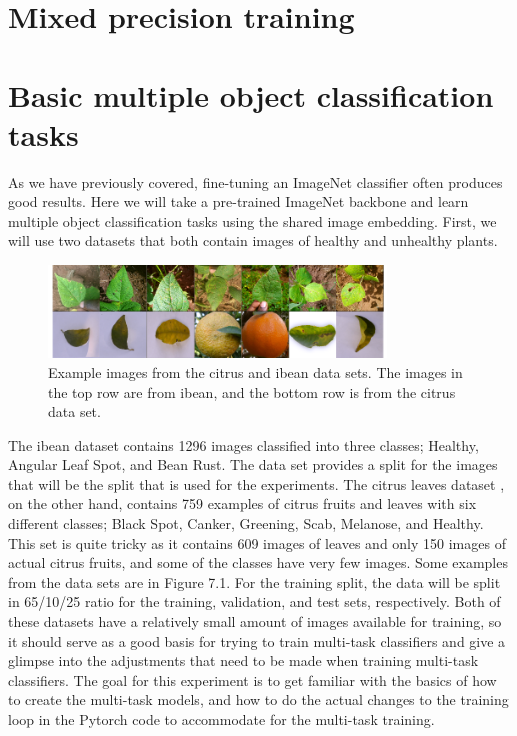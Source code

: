 \section{Mixed precision training}

\section{Basic multiple object classification tasks}
As we have previously covered, fine-tuning an ImageNet classifier often produces good results.
Here we will take a pre-trained ImageNet backbone and learn multiple object classification tasks using the shared image embedding.
First, we will use two datasets that both contain images of healthy and unhealthy plants.

\begin{figure}[h!]
    \centering
    \includegraphics[width=0.8\textwidth]{imgs/citrus_beans_examples.png}
    \caption{Example images from the citrus and ibean data sets.
        The images in the top row are from ibean, and the bottom row is from the citrus data set.}
\end{figure}

The ibean dataset \citep{beansdata} contains 1296 images classified into three classes; Healthy, Angular Leaf Spot, and Bean Rust.
The data set provides a split for the images that will be the split that is used for the experiments.
The citrus leaves dataset \citep{citrusdata}, on the other hand, contains 759 examples of citrus fruits and leaves with six different classes; Black Spot, Canker, Greening, Scab, Melanose, and Healthy.
This set is quite tricky as it contains 609 images of leaves and only 150 images of actual citrus fruits, and some of the classes have very few images.
Some examples from the data sets are in Figure 7.1.
For the training split, the data will be split in 65/10/25 ratio for the training, validation, and test sets, respectively.
Both of these datasets have a relatively small amount of images available for training, so it should serve as a good basis for trying to train multi-task classifiers and give a glimpse into the adjustments that need to be made when training multi-task classifiers.
The goal for this experiment is to get familiar with the basics of how to create the multi-task models, and how to do the actual changes to the training loop in the Pytorch code to accommodate for the multi-task training.

